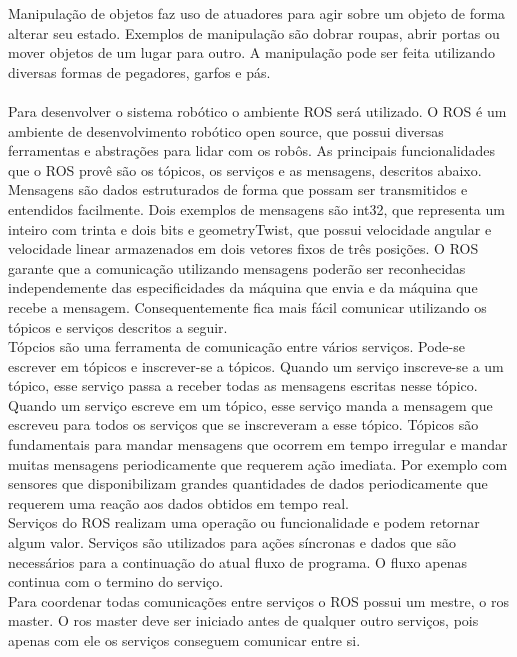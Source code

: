 \documentclass{article}
\begin{document}
Manipulação de objetos faz uso de atuadores para agir sobre um objeto de forma alterar seu estado. Exemplos de manipulação são dobrar roupas, abrir portas ou mover objetos de um lugar para outro. A manipulação pode ser feita utilizando diversas formas de pegadores, garfos e pás. \\ \\

Para desenvolver o sistema robótico o ambiente ROS será utilizado. O ROS é um ambiente de desenvolvimento robótico open source, que possui diversas ferramentas e abstrações para lidar com os robôs. As principais funcionalidades que o ROS provê são os tópicos, os serviços e as mensagens, descritos abaixo.\\
Mensagens são dados estruturados de forma que possam ser transmitidos e entendidos facilmente. Dois exemplos de mensagens são int32, que representa um inteiro com trinta e dois bits e geometryTwist, que possui velocidade angular e velocidade linear armazenados em dois vetores fixos de três posições. O ROS garante que a comunicação utilizando mensagens poderão ser reconhecidas independemente das especificidades da máquina que envia e da máquina que recebe a mensagem. Consequentemente fica mais fácil comunicar utilizando os tópicos e serviços descritos a seguir.\\
	
Tópcios são uma ferramenta de comunicação entre vários serviços. Pode-se escrever em tópicos e inscrever-se a tópicos. Quando um serviço inscreve-se a um tópico, esse serviço passa a receber todas as mensagens escritas nesse tópico. Quando um serviço escreve em um tópico, esse serviço manda a mensagem que escreveu para todos os serviços que se inscreveram a esse tópico. Tópicos são fundamentais para mandar mensagens que ocorrem em tempo irregular e mandar muitas mensagens periodicamente que requerem ação imediata. Por exemplo com sensores que disponibilizam grandes quantidades de dados periodicamente que requerem uma reação aos dados obtidos em tempo real.\\

Serviços do ROS realizam uma operação ou funcionalidade e podem retornar algum valor. Serviços são utilizados para ações síncronas e dados que são necessários para a continuação do atual fluxo de programa. O fluxo apenas continua com o termino do serviço.\\

Para coordenar todas comunicações entre serviços o ROS possui um mestre, o ros master. O ros master deve ser iniciado antes de qualquer outro serviços, pois apenas com ele os serviços conseguem comunicar entre si.\\
\end{document}
